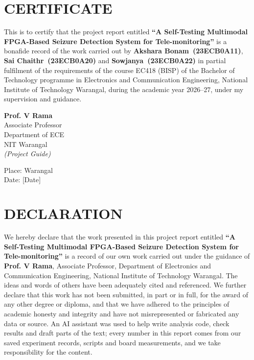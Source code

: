 \documentclass[12pt,a4paper,oneside]{report}
\newcommand{\projtitle}{A Self-Testing Multimodal FPGA-Based Seizure Detection System for Tele-monitoring}
\newcommand{\studentA}{Akshara Bonam}
\newcommand{\rollA}{23ECB0A11}
\newcommand{\studentB}{Sai Chaithr}
\newcommand{\rollB}{23ECB0A20}
\newcommand{\studentC}{Sowjanya}
\newcommand{\rollC}{23ECB0A22}
\newcommand{\guide}{Prof. V Rama}
\newcommand{\guidedesig}{Associate Professor}
\newcommand{\subdate}{[Date]}
\begin{document}
\setcounter{page}{1}

\chapter*{CERTIFICATE}
This is to certify that the project report entitled \textbf{``\projtitle''} is a bonafide record of the work carried
out by \textbf{\studentA\ (\rollA)}, \textbf{\studentB\ (\rollB)} and \textbf{\studentC\ (\rollC)} in partial
fulfilment of the requirements of the course EC418 (BISP) of the Bachelor of Technology programme in Electronics and
Communication Engineering, National Institute of Technology Warangal, during the academic year 2026--27, under my
supervision and guidance.

\vspace{30mm}
\begin{flushright}
\textbf{\guide}\\
\guidedesig\\
Department of ECE\\
NIT Warangal\\
\textit{(Project Guide)}
\end{flushright}

\vspace{12mm}
Place: Warangal\\
Date: \subdate

\chapter*{DECLARATION}
We hereby declare that the work presented in this project report entitled \textbf{``\projtitle''} is a record of our
own work carried out under the guidance of \textbf{\guide}, \guidedesig, Department of Electronics and Communication
Engineering, National Institute of Technology Warangal. The ideas and words of others have been adequately cited and
referenced. We further declare that this work has not been submitted, in part or in full, for the award of any other
degree or diploma, and that we have adhered to the principles of academic honesty and integrity and have not
misrepresented or fabricated any data or source. An AI assistant was used to help write analysis code, check results
and draft parts of the text; every number in this report comes from our saved experiment records, scripts and board
measurements, and we take responsibility for the content.
\end{document}
